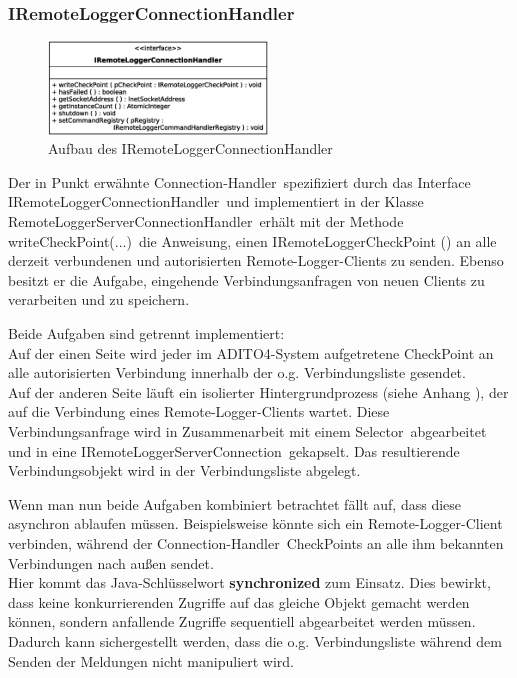 \subsubsection{IRemoteLoggerConnectionHandler}
\begin{figure}
	\hspace{5px}
	\includegraphics[width=220px]{../img/CD-IRemoteLoggerConnectionHandler.eps}
	\caption{Aufbau des \glqq IRemoteLoggerConnectionHandler\grqq}
\end{figure}
\par Der in Punkt  erwähnte \glqq Connection-Handler\grqq\, spezifiziert durch das Interface \glqq IRemoteLoggerConnectionHandler\grqq\ und implementiert in der Klasse \glqq RemoteLoggerServerConnectionHandler\grqq\, erhält mit der Methode \glqq writeCheckPoint(...)\grqq\ die Anweisung, einen IRemoteLoggerCheckPoint () an alle derzeit verbundenen und autorisierten Remote-Logger-Clients zu senden. Ebenso besitzt er die Aufgabe, eingehende Verbindungsanfragen von neuen Clients zu verarbeiten und zu speichern.
\par Beide Aufgaben sind getrennt implementiert: \\
Auf der einen Seite wird jeder im ADITO4-System aufgetretene CheckPoint an alle autorisierten Verbindung innerhalb der o.g. Verbindungsliste gesendet.\\
Auf der anderen Seite läuft ein isolierter Hintergrundprozess (siehe Anhang ), der auf die Verbindung eines Remote-Logger-Clients wartet. Diese Verbindungsanfrage wird in Zusammenarbeit mit einem \glqq Selector\grqq\ abgearbeitet und in eine \glqq IRemoteLoggerServerConnection\grqq\ gekapselt. Das resultierende Verbindungsobjekt wird in der Verbindungsliste abgelegt.
\par Wenn man nun beide Aufgaben kombiniert betrachtet fällt auf, dass diese asynchron ablaufen müssen. Beispielsweise könnte sich ein Remote-Logger-Client verbinden, während der \glqq Connection-Handler\grqq\ CheckPoints an alle ihm bekannten Verbindungen nach außen sendet. \\
Hier kommt das Java-Schlüsselwort \textbf{synchronized} zum Einsatz. Dies bewirkt, dass keine konkurrierenden Zugriffe auf das gleiche Objekt gemacht werden können, sondern anfallende Zugriffe sequentiell abgearbeitet werden müssen. Dadurch kann sichergestellt werden, dass die o.g. Verbindungsliste während dem Senden der Meldungen nicht manipuliert wird.

